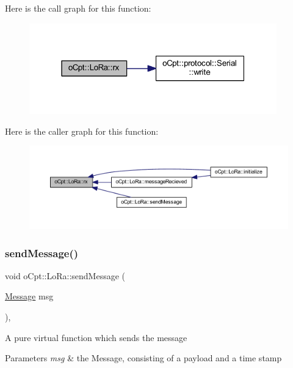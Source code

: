 Here is the call graph for this function\+:\nopagebreak
\begin{figure}[H]
\begin{center}
\leavevmode
\includegraphics[width=304pt]{classo_cpt_1_1_lo_ra_aa9051cc9d611edc2b5e1f36124d4e972_cgraph}
\end{center}
\end{figure}
Here is the caller graph for this function\+:\nopagebreak
\begin{figure}[H]
\begin{center}
\leavevmode
\includegraphics[width=350pt]{classo_cpt_1_1_lo_ra_aa9051cc9d611edc2b5e1f36124d4e972_icgraph}
\end{center}
\end{figure}
\hypertarget{classo_cpt_1_1_lo_ra_a053e29e992490cffb90741c009664272}{}\label{classo_cpt_1_1_lo_ra_a053e29e992490cffb90741c009664272} 
\subsubsection{\texorpdfstring{send\+Message()}{sendMessage()}}
{\footnotesize\ttfamily void o\+Cpt\+::\+Lo\+Ra\+::send\+Message (\begin{DoxyParamCaption}\item[{\hyperlink{structo_cpt_1_1i_comm_1_1_message}{Message}}]{msg }\end{DoxyParamCaption})\hspace{0.3cm}{\ttfamily [override]}, {\ttfamily [virtual]}}

A pure virtual function which sends the message 
\begin{DoxyParams}{Parameters}
{\em msg} & the Message, consisting of a payload and a time stamp \\
\hline
\end{DoxyParams}



